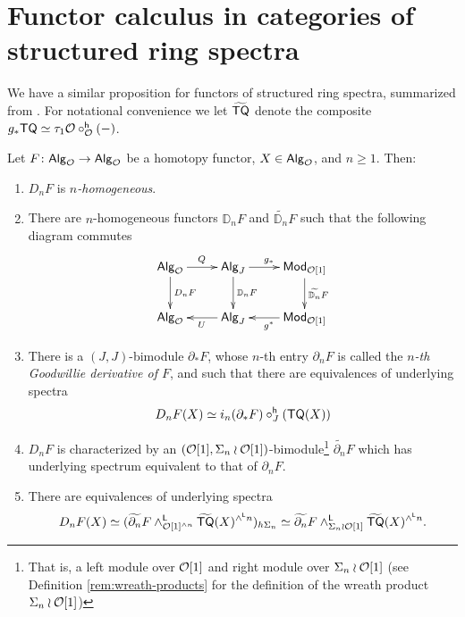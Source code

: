 \section{Functor calculus in categories of structured ring spectra} We have a similar proposition for functors of structured ring spectra, summarized from \cite{Per-thesis}. For notational convenience we let $\widetilde{\mathsf{TQ}}$ denote the composite $g_* \mathsf{TQ} \simeq \tau_1\mathcal{O} \circ^{\mathsf{h}}_{\mathcal{O}}(-)$.

\begin{proposition}
\label{prop:functor-calc-recap}
Let $F\colon {\mathsf{Alg}_{\mathcal{O}}}\to {\mathsf{Alg}_{\mathcal{O}}}$ be a homotopy functor, $X\in {\mathsf{Alg}_{\mathcal{O}}}$, and $n\geq 1$. Then: \begin{enumerate}[label=(\roman*)]
    \item $D_nF$ is \textit{$n$-homogeneous}.

    \item There are $n$-homogeneous functors $\mathbb{D}_n F$ and $\widetilde{\mathbb{D}_n}F$ such that the following diagram commutes
    \begin{equation} \label{eq:fact}
    \xymatrix{
    \Alg{O} \ar[r]^{Q} \ar[d]^-{D_nF} &
    \mathsf{Alg}_{J} \ar[r]^{g_*} \ar[d]^-{\mathbb{D}_n F} &
    \mathsf{Mod}_{\Cal{O}[1]}  \ar[d]^-{\widetilde{\mathbb{D}_n}F} \\
    \Alg{O}  &
    \mathsf{Alg}_{J} \ar[l]^{U}  &
    \mathsf{Mod}_{\Cal{O}[1]} \ar[l]^{g^*}
    }  
\end{equation}

    \item There is a $(J,J)$-bimodule $\partial_*F$, whose $n$-th entry $\partial_n F$ is called the \textit{$n$-th Goodwillie derivative of $F$}, and such that there are equivalences of underlying spectra \begin{equation*}\label{homog-layer-2}
    D_n F(X) \simeq  i_n (\partial_* F) \circ^{\mathsf{h}}_J (\mathsf{TQ}(X)) \end{equation*} 
    
    \item $D_nF$ is characterized by an $(\mathcal{O}[1],\Sigma_n \wr \mathcal{O}[1])$-bimodule\footnote{That is, a left module over $\mathcal{O}[1]$ and right module over $\Sigma_n \wr \mathcal{O}[1]$
        (see Definition \ref{rem:wreath-products} for the definition of the wreath product $\Sigma_n \wr \mathcal{O}[1]$)
    } $\widetilde{\partial_n}F$ which has underlying spectrum equivalent to that of $\partial_nF$. 
    
    \item There are equivalences of underlying spectra \begin{equation}\label{homog-layer-1}
    D_n F(X) \simeq (\widetilde{\partial_n} F \wedge^{\mathsf{L}}_{\mathcal{O}[1]^{\wedge n}} \widetilde{\mathsf{TQ}}(X)^{\wedge^{\mathsf{L}} n})_{h\Sigma_n}
    \simeq \widetilde{\partial_n} F\wedge^{\mathsf{L}}_{\Sigma_n \wr \mathcal{O}[1]} \widetilde{\mathsf{TQ}}(X)^{\wedge^{\mathsf{L}} n}. \end{equation}


\end{enumerate}
\end{proposition}
